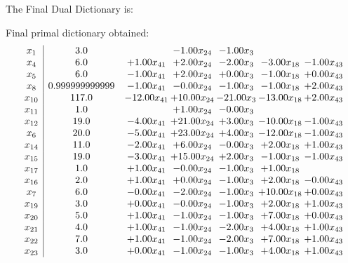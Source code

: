 \documentclass[8pt]{article}
\begin{document}
The Final Dual Dictionary is: 

 Final primal dictionary obtained: 
\[\begin{array}{c| c c@{\hskip 2pt} c@{\hskip 2pt} c@{\hskip 2pt} c@{\hskip 2pt} c@{\hskip 2pt} }
 x_{1}   &  3.0  &   & -1.00 x_{24} & -1.00 x_{3} &    &   \\
 x_{4}   &  6.0 & +  1.00 x_{41} & +  2.00 x_{24} & -2.00 x_{3} & -3.00 x_{18} & -1.00 x_{43}\\
 x_{5}   &  6.0 & -1.00 x_{41} & +  2.00 x_{24} & +  0.00 x_{3} & -1.00 x_{18} & +  0.00 x_{43}\\
 x_{8}   &  0.999999999999 & -1.00 x_{41} & -0.00 x_{24} & -1.00 x_{3} & -1.00 x_{18} & +  2.00 x_{43}\\
 x_{10}   &  117.0 & -12.00 x_{41} & + 10.00 x_{24} & -21.00 x_{3} & -13.00 x_{18} & +  2.00 x_{43}\\
 x_{11}   &  1.0  &   & +  1.00 x_{24} & -0.00 x_{3} &    &   \\
 x_{12}   &  19.0 & -4.00 x_{41} & + 21.00 x_{24} & +  3.00 x_{3} & -10.00 x_{18} & -1.00 x_{43}\\
 x_{6}   &  20.0 & -5.00 x_{41} & + 23.00 x_{24} & +  4.00 x_{3} & -12.00 x_{18} & -1.00 x_{43}\\
 x_{14}   &  11.0 & -2.00 x_{41} & +  6.00 x_{24} & -0.00 x_{3} & +  2.00 x_{18} & +  1.00 x_{43}\\
 x_{15}   &  19.0 & -3.00 x_{41} & + 15.00 x_{24} & +  2.00 x_{3} & -1.00 x_{18} & -1.00 x_{43}\\
 x_{17}   &  1.0 & +  1.00 x_{41} & -0.00 x_{24} & -1.00 x_{3} & +  1.00 x_{18} &   \\
 x_{16}   &  2.0 & +  1.00 x_{41} & +  0.00 x_{24} & -1.00 x_{3} & +  2.00 x_{18} & -0.00 x_{43}\\
 x_{7}   &  6.0 & -0.00 x_{41} & -2.00 x_{24} & -1.00 x_{3} & + 10.00 x_{18} & +  0.00 x_{43}\\
 x_{19}   &  3.0 & +  0.00 x_{41} & -0.00 x_{24} & -1.00 x_{3} & +  2.00 x_{18} & +  1.00 x_{43}\\
 x_{20}   &  5.0 & +  1.00 x_{41} & -1.00 x_{24} & -1.00 x_{3} & +  7.00 x_{18} & +  0.00 x_{43}\\
 x_{21}   &  4.0 & +  1.00 x_{41} & -1.00 x_{24} & -2.00 x_{3} & +  4.00 x_{18} & +  1.00 x_{43}\\
 x_{22}   &  7.0 & +  1.00 x_{41} & -1.00 x_{24} & -2.00 x_{3} & +  7.00 x_{18} & +  1.00 x_{43}\\
 x_{23}   &  3.0 & +  0.00 x_{41} & -1.00 x_{24} & -1.00 x_{3} & +  4.00 x_{18} & +  1.00 x_{43}\\

\end{array}\]
\end{document}
